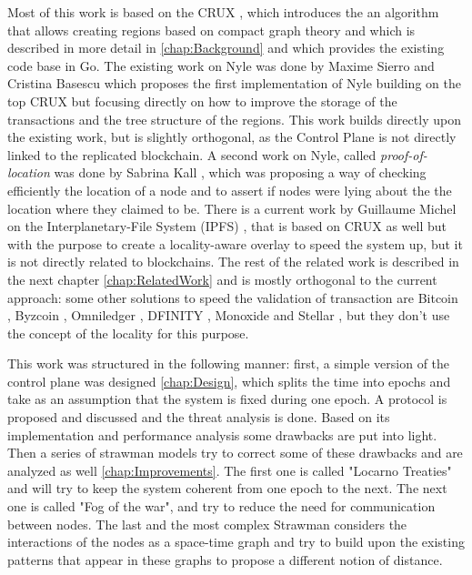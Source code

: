 \documentclass[a4paper,11pt,oneside]{report}
\begin{document}
Most of this work is based on the CRUX \cite{Basescu2014}, which introduces the
an algorithm that allows creating regions based on compact graph theory and
which is described in more detail in \autoref{chap:Background} and which
provides the existing code base in Go. The existing work on Nyle was done by
Maxime Sierro and Cristina Basescu \cite{Sierro2019} which proposes the first
implementation of Nyle building on the top CRUX \cite{Basescu2014} but focusing
directly on how to improve the storage of the transactions and the tree
structure of the regions. This work builds directly upon the existing work, but
is slightly orthogonal, as the Control Plane is not directly linked to the
replicated blockchain. A second work on Nyle, called \textit{proof-of-location}
was done by Sabrina Kall \cite{Kall2019}, which was proposing a way of checking
efficiently the location of a node and to assert if nodes were lying about the
the location where they claimed to be. There is a current work by Guillaume
Michel on the Interplanetary-File System (IPFS) \cite{Michel2019}, that is
based on CRUX as well but with the purpose to create a locality-aware overlay
to speed the system up, but it is not directly related to blockchains. The rest
of the related work is described in the next chapter \autoref{chap:RelatedWork}
and is mostly orthogonal to the current approach: some other solutions to speed
the validation of transaction are Bitcoin \cite{Nakamoto2009}, Byzcoin
\cite{Kogias2016}, Omniledger \cite{Kokoris-Kogias2017}, DFINITY
\cite{Hanke2018}, Monoxide \cite{Wang2019} and Stellar \cite{Lokhava2019}, but
they don't use the concept of the locality for this purpose. 

This work was structured in the following manner: first, a simple version of
the control plane was designed \autoref{chap:Design}, which splits the time
into epochs and take as an assumption that the system is fixed during one
epoch. A protocol is proposed and discussed and the threat analysis is done.
Based on its implementation and performance analysis some drawbacks are put
into light.  Then a series of strawman models try to correct some of these
drawbacks and are analyzed as well \autoref{chap:Improvements}. The first one
is called "Locarno Treaties" and will try to keep the system coherent from one
epoch to the next.  The next one is called "Fog of the war", and try to reduce
the need for communication between nodes. The last and the most complex
Strawman considers the interactions of the nodes as a space-time graph and try
to build upon the existing patterns that appear in these graphs to propose a
different notion of distance. 
\end{document}
